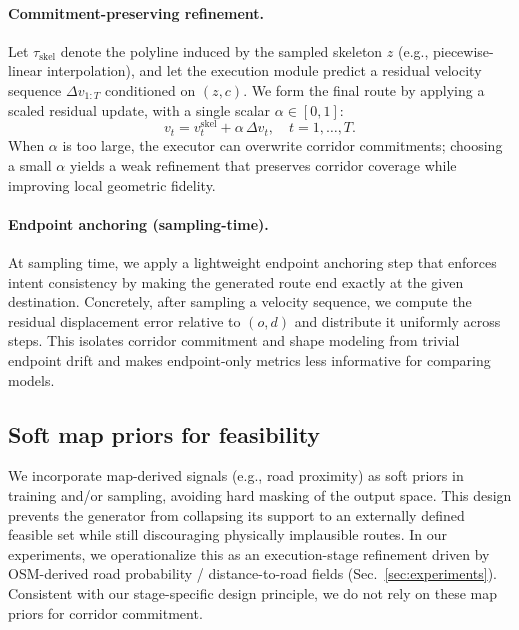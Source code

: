 \paragraph{Commitment-preserving refinement.}
Let $\tau_{\text{skel}}$ denote the polyline induced by the sampled skeleton $z$ (e.g., piecewise-linear interpolation),
and let the execution module predict a residual velocity sequence $\Delta v_{1:T}$ conditioned on $(z,c)$.
We form the final route by applying a scaled residual update, with a single scalar $\alpha \in [0,1]$:
\begin{equation}
  v_t = v^{\text{skel}}_t + \alpha \,\Delta v_t,\quad t=1,\dots,T.
\end{equation}
When $\alpha$ is too large, the executor can overwrite corridor commitments; choosing a small $\alpha$ yields a weak refinement that preserves corridor coverage while improving local geometric fidelity.

\paragraph{Endpoint anchoring (sampling-time).}
\label{sec:endpoint-anchoring}
At sampling time, we apply a lightweight endpoint anchoring step that enforces intent consistency by making the generated route end exactly at the given destination.
Concretely, after sampling a velocity sequence, we compute the residual displacement error relative to $(o,d)$ and distribute it uniformly across steps.
This isolates corridor commitment and shape modeling from trivial endpoint drift and makes endpoint-only metrics less informative for comparing models.

\subsection{Soft map priors for feasibility}
We incorporate map-derived signals (e.g., road proximity) as soft priors in training and/or sampling, avoiding hard masking of the output space.
This design prevents the generator from collapsing its support to an externally defined feasible set while still discouraging physically implausible routes.
In our experiments, we operationalize this as an execution-stage refinement driven by OSM-derived road probability / distance-to-road fields (Sec.~\ref{sec:experiments}).
Consistent with our stage-specific design principle, we do not rely on these map priors for corridor commitment.
